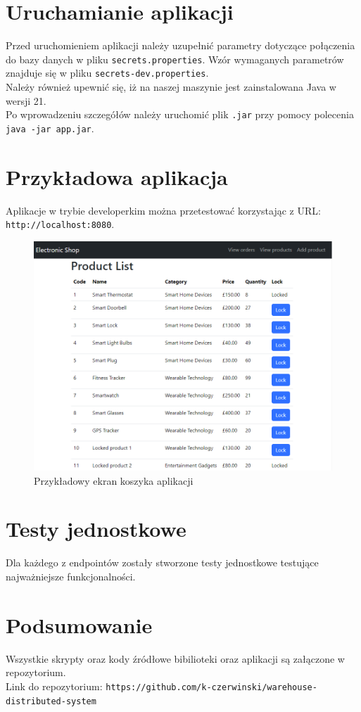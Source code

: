 \documentclass{article}
\begin{document}
\section{Uruchamianie aplikacji}
Przed uruchomieniem aplikacji należy uzupełnić parametry dotyczące połączenia do bazy danych w pliku \verb|secrets.properties|. Wzór wymaganych parametrów znajduje się w pliku \verb|secrets-dev.properties|. \\
Należy również upewnić się, iż na naszej maszynie jest zainstalowana Java w wersji 21. \\
Po wprowadzeniu szczegółów należy uruchomić plik \verb|.jar| przy pomocy polecenia \verb|java -jar app.jar|.
\newpage
\section{Przykładowa aplikacja}
Aplikacje w trybie developerkim można przetestować korzystając z URL: \verb|http://localhost:8080|.
\begin{figure}[h!]
    \centering
    \includegraphics[width = \textwidth]{admin_products_2.png}
    \caption{Przykładowy ekran koszyka aplikacji}
    \label{fig:enter-label}
\end{figure}
\section{Testy jednostkowe}
Dla każdego z endpointów zostały stworzone testy jednostkowe testujące najważniejsze funkcjonalności.
\section{Podsumowanie}
Wszystkie skrypty oraz kody źródłowe bibilioteki oraz aplikacji są załączone w repozytorium. \\
Link do repozytorium: \verb|https://github.com/k-czerwinski/warehouse-distributed-system|
\end{document}
